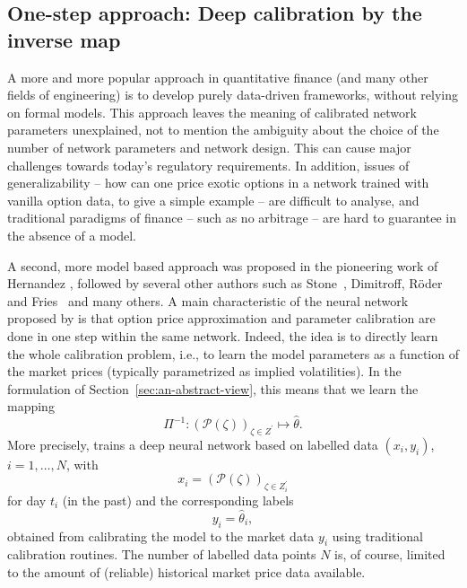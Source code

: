 \documentclass{article}
\theoremstyle{remark}
\begin{document}

\subsection{One-step approach: Deep calibration by the inverse map}
\label{sec:hernandez}
A more and more popular approach in quantitative finance (and many other
fields of engineering) is to develop purely data-driven frameworks, without
relying on formal models. This approach leaves the meaning of calibrated network
parameters unexplained, not to mention the ambiguity about the choice of the
number of network parameters and network design. This can cause major
challenges towards today's regulatory requirements. In addition, issues of
generalizability -- how can one price exotic options in a network trained with
vanilla option data, to give a simple example -- are difficult to analyse, and
traditional paradigms of finance -- such as no arbitrage -- are hard to
guarantee in the absence of a model.

A second, more model based approach was proposed in the pioneering work of
Hernandez \cite{Hernandez}, followed by several other authors such as
Stone~\cite{Stone}, Dimitroff, R\"oder and Fries~\cite{HestonConvolutional} and
many others. A main characteristic of the neural network proposed by
\cite{Hernandez} is that option price approximation and parameter calibration
are done in one step within the same network.
Indeed, the idea is to directly learn the whole calibration problem, i.e., to
learn the model parameters as a function of the market prices (typically
parametrized as implied volatilities). In the formulation of
Section~\ref{sec:an-abstract-view}, this means that we learn the mapping
\begin{equation*}
  \Pi^{-1}: \left( \mathcal{P}(\zeta) \right)_{\zeta \in Z^\prime} \mapsto \widehat{\theta}.
\end{equation*}
More precisely, \cite{Hernandez} trains a deep neural network based on
labelled data $(x_i, y_i)$, $i = 1, \ldots, N$, with
\begin{equation*}
  x_i = \left( \mathcal{P}(\zeta) \right)_{\zeta \in Z^\prime_i}
\end{equation*}
for day $t_i$ (in the past) and the corresponding labels
\begin{equation*}
  y_i = \widehat{\theta}_i,
\end{equation*}
obtained from calibrating the model to the market data $y_i$ using traditional
calibration routines. The number of labelled data points $N$ is, of course,
limited to the amount of (reliable) historical market price data available.
\end{document}

